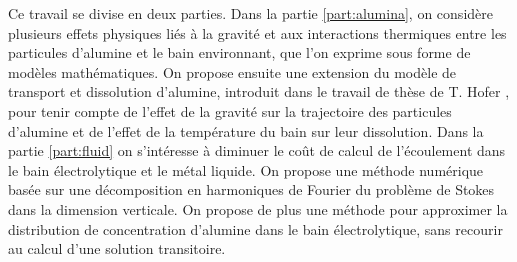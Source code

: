 Ce travail se divise en deux parties. Dans la partie
\ref{part:alumina}, on considère plusieurs effets physiques liés à la
gravité et aux interactions thermiques entre les particules d'alumine
et le bain environnant, que l'on exprime sous forme de modèles
mathématiques. On propose ensuite une extension du modèle de transport
et dissolution d'alumine, introduit dans le travail de thèse de
T. Hofer \cite{Hofer2011}, pour tenir compte de l'effet de la gravité
sur la trajectoire des particules d'alumine et de l'effet de la
température du bain sur leur dissolution.  Dans la partie
\ref{part:fluid} on s'intéresse à diminuer le coût de calcul de
l'écoulement dans le bain électrolytique et le métal liquide. On
propose une méthode numérique basée sur une décomposition en
harmoniques de Fourier du problème de Stokes dans la dimension
verticale. On propose de plus une méthode pour approximer la
distribution de concentration d'alumine dans le bain électrolytique,
sans recourir au calcul d'une solution transitoire.
